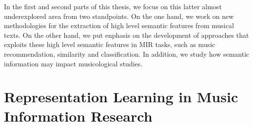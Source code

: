 
In the first and second parts of this thesis, we focus on this latter almost underexplored area from two standpoints. On the one hand, we work on new methodologies for the extraction of high level semantic features from musical texts. On the other hand, we put enphasis on the development of approaches that exploits these high level semantic features in MIR tasks, such as music recommendation, similarity and classification. In addition, we study how semantic information may impact musicological studies.

\section{Representation Learning in Music Information Research}
\label{sec:intro:learning}


